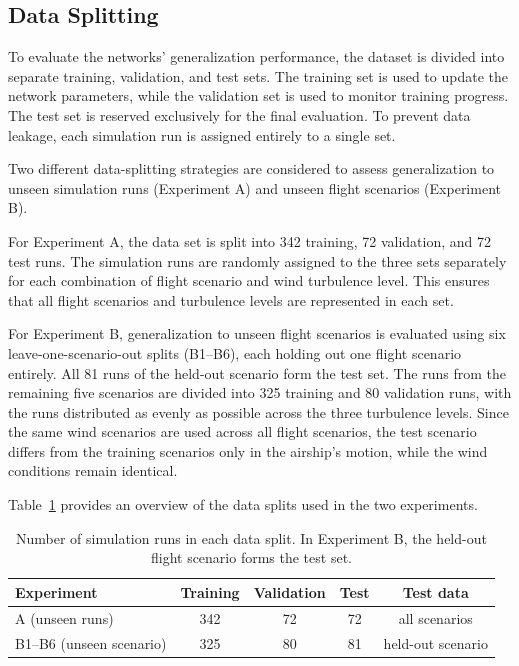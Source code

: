 \subsection{Data Splitting}
\label{sec:4.2.1DataSplitting}

To evaluate the networks' generalization performance, the dataset is divided into separate training, validation, and test sets. The training set is used to update the network parameters, while the validation set is used to monitor training progress. The test set is reserved exclusively for the final evaluation. To prevent data leakage, each simulation run is assigned entirely to a single set.

Two different data-splitting strategies are considered to assess generalization to unseen simulation runs (Experiment A) and unseen flight scenarios (Experiment B).

For Experiment A, the data set is split into 342 training, 72 validation, and 72 test runs. The simulation runs are randomly assigned to the three sets separately for each combination of flight scenario and wind turbulence level. This ensures that all flight scenarios and turbulence levels are represented in each set.

For Experiment B, generalization to unseen flight scenarios is evaluated using six leave-one-scenario-out splits (B1--B6), each holding out one flight scenario entirely. All 81 runs of the held-out scenario form the test set. The runs from the remaining five scenarios are divided into 325 training and 80 validation runs, with the runs distributed as evenly as possible across the three turbulence levels.
Since the same wind scenarios are used across all flight scenarios, the test scenario differs from the training scenarios only in the airship's motion, while the wind conditions remain identical.

Table~\ref{tab:data_splits} provides an overview of the data splits used in the two experiments.

\begin{table}[htb]
	\centering
	\caption{Number of simulation runs in each data split. In Experiment B, the held-out flight scenario forms the test set.}
	\label{tab:data_splits}
	\begin{tabular}{lcccc}
		\toprule
		Experiment & Training & Validation & Test & Test data \\
		\midrule
		A (unseen runs)        & 342 & 72 & 72 & all scenarios \\
		B1--B6 (unseen scenario) & 325 & 80 & 81 & held-out scenario \\
		\bottomrule
	\end{tabular}
\end{table}





